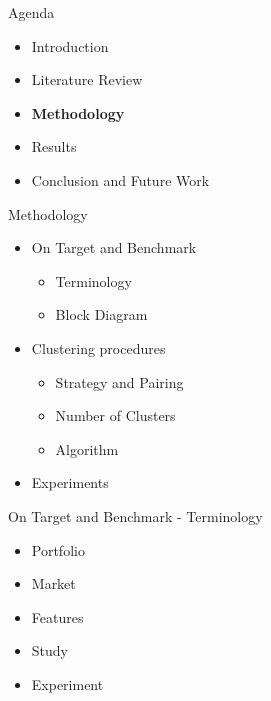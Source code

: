 \begin{frame}{Agenda}
\begin{itemize}
    \item Introduction
    \item Literature Review
    \item \textbf{Methodology}
    \item Results
    \item Conclusion and Future Work
\end{itemize}
\end{frame}


\begin{frame}{Methodology}
\begin{itemize}
    \item{On Target and Benchmark\\ }
        \begin{itemize}
            \item<2-> Terminology
            \item<2-> Block Diagram 
        \end{itemize}
    \vspace{0.3cm}
    \item{Clustering procedures\\}
        \begin{itemize}
            \item<3-> Strategy and Pairing 
            \item<3-> Number of Clusters
            \item<3-> Algorithm
        \end{itemize}
    \item{Experiments\\}
\end{itemize}
\end{frame}


\begin{frame}{On Target and Benchmark - Terminology} 
    \pause
    \begin{itemize}
        \item Portfolio
        \vspace{0.1cm}
        \item Market
        \vspace{0.1cm}
        \item Features
        \vspace{0.1cm}
        \item Study
        \vspace{0.1cm}
        \item Experiment
    \end{itemize}
\end{frame}

